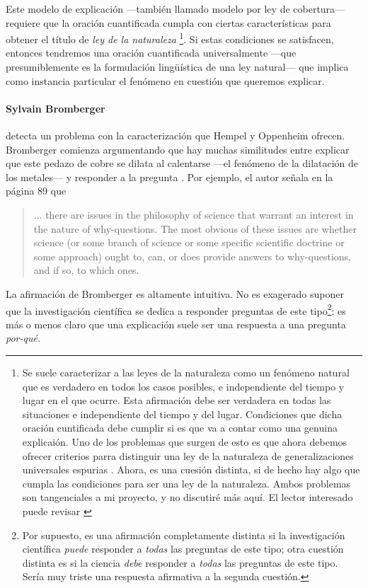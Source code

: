 Este modelo de explicación ---también llamado modelo por ley de
cobertura--- requiere que la oración cuantificada cumpla con ciertas
características para obtener el título de \emph{ley de la naturaleza}
\footnote{ Se suele caracterizar a las leyes de la naturaleza como un
 fenómeno natural que es verdadero en todos los casos posibles, e
 independiente del tiempo y lugar en el que ocurre. Esta afirmación
 debe ser verdadera en todas las situaciones e independiente del
 tiempo y del lugar. Condiciones que dicha oración cuntificada debe
 cumplir si es que va a contar como una genuina explicaión. Uno de los
 problemas que surgen de esto es que ahora debemos ofrecer criterios
 parra distinguir una ley de la naturaleza de generalizaciones
 universales espurias \parencite {Nagel1962}. Ahora, es una cuesión
 distinta, si de hecho hay algo que cumpla las condiciones para ser
 una ley de la naturaleza. Ambos problemas son tangenciales a mi
 proyecto, y no discutiré más aquí. El lector interesado puede revisar
 \parencite{sep-laws-of-nature} }. Si estas condiciones se satisfacen,
entonces tendremos una oración cuantificada universalmente ---que
presumiblemente es la formulación lingüística de una ley natural---
que implica como instancia particular el fenómeno en cuestión que
queremos explicar.

\paragraph{Sylvain Bromberger \parencite{Bromberger1966,}} detecta un
problema con la caracterización que Hempel y Oppenheim ofrecen.
Bromberger comienza argumentando que hay muchas similitudes entre
explicar que este pedazo de cobre se dilata al calentarse ---el
fenómeno de la dilatación de los metales--- y responder a la pregunta
. Por ejemplo,
el autor señala en la página 89 que

\begin{quote}
 $\ldots$ there are issues in the philosophy of science that
 warrant an interest in the nature of why-questions.
 The most obvious of these issues are whether science (or some branch
 of science or some specific scientific doctrine or some approach)
 ought to, can, or does provide answers to why-questions, and if so,
 to which ones.
\end{quote}

La afirmación de Bromberger es altamente intuitiva. No es exagerado
suponer que la investigación científica se dedica a responder
preguntas de este tipo\footnote{ Por supuesto, es una afirmación
 completamente distinta si la investigación científica \emph{puede}
 responder a \emph{todas} las preguntas de este tipo; otra cuestión
 distinta es si la ciencia \emph{debe} responder a \emph{todas} las
 preguntas de este tipo. Sería muy triste una respuesta afirmativa a
 la segunda cuestión. }: es más o menos claro que una explicación
suele ser una respuesta a una pregunta \emph{por-qué}.

